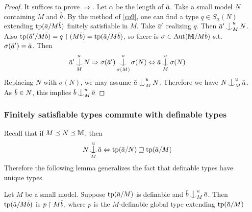 \documentclass[11pt]{article}
\begin{document}
\begin{proof}
It suffices to prove \(\Rightarrow\). Let \(\alpha\) be the length of \(\bara\). Take a small model \(N\)
containing \(M\) and \(\barb\). By the method of \ref{co9}, one can find a type \(q\in S_\alpha(N)\)
extending \(\tp(\bara/M\barb)\) finitely satisfiable in \(M\). Take \(\bara'\) realizing \(q\).
Then \(\bara'\ind_M^uN\). Also \(\tp(\bara'/M\barb)=q\uhr(M\barb)=\tp(\bara/M\barb)\), so there
is \(\sigma\in\Aut(\M/M\barb)\) s.t. \(\sigma(\bara')=\bara\). Then
\begin{equation*}
\bara'\ind_M^uN\Rightarrow\sigma(\bara')\ind_{\sigma(M)}^u\sigma(N)\Leftrightarrow\bara\ind_M^u\sigma(N)
\end{equation*}
Replacing \(N\) with \(\sigma(N)\), we may assume \(\bara\ind_M^uN\).  Therefore we
have \(N\ind_M^u\bara\). As \(\barb\in N\), this implies \(\barb\ind_M^u\bara\)
\end{proof}

\subsubsection{Finitely satisfiable types commute with definable types}
\label{sec:orgdcfd280}
Recall that if \(M\preceq N\preceq\mathbb{M}\), then
\begin{equation*}
N\ind_M^u\bara\Leftrightarrow\tp(\bara/N)\sqsupseteq\tp(\bara/M)
\end{equation*}
Therefore the following lemma generalizes the fact that definable types have unique types
\begin{lemma}[]
\label{ci2.1}
Let \(M\) be a small model. Suppose \(\tp(\bara/M)\) is definable and \(\barb\ind_M^u\bara\).
Then \(\tp(\bara/M\barb)\) is \(p\uhr M\barb\), where \(p\) is the \(M\)-definable global type
extending \(\tp(\bara/M)\)
\end{lemma}
\end{document}
